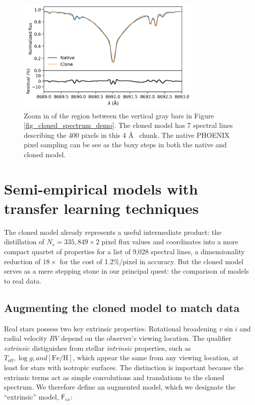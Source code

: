 \documentclass[modern]{aastex631}
\begin{document}
\begin{figure}[hbt!]
    \centering
    \includegraphics[width=0.8\textwidth]{figures/blase_clone_demo_zoom.png}
    \caption{Zoom in of the region between the vertical gray bars in Figure \ref{fig_cloned_spectrum_demo}. The cloned model has 7 spectral lines describing the 400 pixels in this 4 \AA~ chunk.  The native PHOENIX pixel sampling can be see as the boxy steps in both the native and cloned model.  }
    \label{fig_zoom_cloning_performance}
\end{figure}


\section{Semi-empirical models with transfer learning techniques}


The cloned model already represents a useful intermediate product: the distillation of $N_s=335,849\times2$ pixel flux values and coordinates into a more compact quartet of properties for a list of 9,028 spectral lines, a dimensionality reduction of $18\times$ for the cost of 1.2\%/pixel in accuracy.  But the cloned model serves as a mere stepping stone in our principal quest: the comparison of models to real data.

\subsection{Augmenting the cloned model to match data}
Real stars possess two key extrinsic properties.  Rotational broadening $v\sin{i}$ and radial velocity $RV$ depend on the observer's viewing location. The qualifier \emph{extrinsic} distiguishes from stellar \emph{intrinsic} properties, such as $T_{\mathrm{eff}}, \log{g}, and [\mathrm{Fe}/\mathrm{H}]$, which appear the same from any viewing location, at least for stars with isotropic surfaces.  The distinction is important because the extrinsic terms act as simple convolutions and translations to the cloned spectrum.  We therefore define an augmented model, which we designate the ``extrinsic'' model, $\mathsf{F}_{ex}$:
\end{document}
